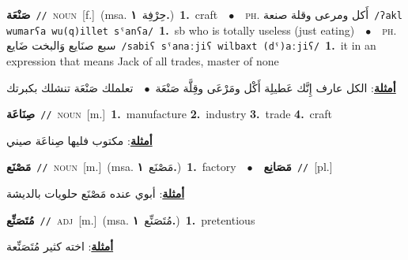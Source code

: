 \documentclass[10pt,a4paper,twoside]{article} %
\begin{document}
\begin{multicols}{2}
{\setlength\topsep{0pt}\textbf{\foreignlanguage{arabic}{صَنْعَة}}\ {\color{gray}\texttt{//}\color{black}}\ \textsc{noun}\ [f.]\ \color{gray}(msa. \foreignlanguage{arabic}{حِرْفِة}~\foreignlanguage{arabic}{\textbf{١.}})\color{black}\ \textbf{1.}~craft\ \ $\bullet$\ \ \textsc{ph.} \color{gray} \foreignlanguage{arabic}{أَكل ومرعى وقلة صنعة}\color{black}\ {\color{gray}\texttt{/{\sffamily ʔakl wumarʕa wu(q)illet sˤanʕa}/}\color{black}}\ \textbf{1.}~sb who is totally useless (just eating)\ \ $\bullet$\ \ \textsc{ph.} \color{gray} \foreignlanguage{arabic}{سبع صنَايع وَالبخت ضَايع}\color{black}\ {\color{gray}\texttt{/{\sffamily sabiʕ sˤanaːjiʕ wilbaxt (dˤ)aːjiʕ}/}\color{black}}\ \textbf{1.}~it in an expression that means Jack of all trades, master of none\  \begin{flushright}\color{gray}\foreignlanguage{arabic}{\textbf{\underline{\foreignlanguage{arabic}{أمثلة}}}: الكل عارف إِنَّك عَطيلِة أَكْل ومَرْعَى وقِلَّة صَنْعَة\ $\bullet$\ \  تعلملك صَنْعَة تنشلك بكبرتك}\end{flushright}\color{black}} \vspace{2mm}

{\setlength\topsep{0pt}\textbf{\foreignlanguage{arabic}{صِنَاعَة}}\ {\color{gray}\texttt{//}\color{black}}\ \textsc{noun}\ [m.]\ \textbf{1.}~manufacture  \textbf{2.}~industry  \textbf{3.}~trade  \textbf{4.}~craft\  \begin{flushright}\color{gray}\foreignlanguage{arabic}{\textbf{\underline{\foreignlanguage{arabic}{أمثلة}}}: مكتوب فليها صِناعَة صيني}\end{flushright}\color{black}} \vspace{2mm}

{\setlength\topsep{0pt}\textbf{\foreignlanguage{arabic}{مَصْنَع}}\ {\color{gray}\texttt{//}\color{black}}\ \textsc{noun}\ [m.]\ \color{gray}(msa. \foreignlanguage{arabic}{مَصْنَع}~\foreignlanguage{arabic}{\textbf{١.}})\color{black}\ \textbf{1.}~factory\ \ $\bullet$\ \ \setlength\topsep{0pt}\textbf{\foreignlanguage{arabic}{مَصَانِع}}\ {\color{gray}\texttt{//}\color{black}}\ [pl.]\  \begin{flushright}\color{gray}\foreignlanguage{arabic}{\textbf{\underline{\foreignlanguage{arabic}{أمثلة}}}: أبوي عنده مَصْنَع حلويات بالديشة}\end{flushright}\color{black}} \vspace{2mm}

{\setlength\topsep{0pt}\textbf{\foreignlanguage{arabic}{مُتَصَنِّع}}\ {\color{gray}\texttt{//}\color{black}}\ \textsc{adj}\ [m.]\ \color{gray}(msa. \foreignlanguage{arabic}{مُتَصَنِّع}~\foreignlanguage{arabic}{\textbf{١.}})\color{black}\ \textbf{1.}~pretentious\  \begin{flushright}\color{gray}\foreignlanguage{arabic}{\textbf{\underline{\foreignlanguage{arabic}{أمثلة}}}: اخته كثير مُتَصَنِّعة}\end{flushright}\color{black}} \vspace{2mm}


\end{multicols}
\end{document}
